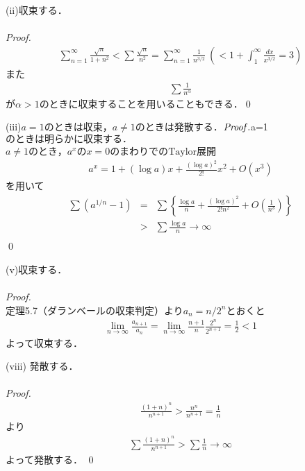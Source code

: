 \documentclass[dvipdfmx,uplatex,11pt]{jsarticle}
\begin{document}
	\begin{screen}
	(ii)収束する．\\
	\dotfill \\
	{\it Proof.}
	\begin{eqnarray*}
	\sum ^{\infty}_{n=1}\frac{\sqrt{n}}{1+n^2}<\sum \frac{\sqrt{n}}{n^2}=\sum^{\infty}_{n=1}\frac{1}{n^{3/2}}~\left(<1+\int^{\infty}_{1}\frac{dx}{x^{3/2}}=3\right)
	\end{eqnarray*}
	また
	\begin{eqnarray*}
	\sum \frac{1}{n^\alpha}
	\end{eqnarray*}
	が$\alpha >1$のときに収束することを用いることもできる．\qed
	\end{screen}
	\begin{screen}
	(iii)$a=1$のときは収束，$a \neq 1$のときは発散する．$\\
	\dotfill \\
	{\it Proof.}\\
	$a=1$のときは明らかに収束する．$\\
	$a \neq 1$のとき，$a^x$の$x=0$のまわりでの$\mathrm{Taylor}$展開
	\begin{eqnarray*}
	a^x=1+(\log a)x+\frac{(\log a)^2}{2!}x^2+O(x^3)
	\end{eqnarray*}
	を用いて
	\begin{eqnarray*}
	\sum (a^{1/n}-1)&=&\sum \left\{ \frac{\log a}{n}+\frac{(\log a)^2}{2!n^2}+O\left(\frac{1}{n^3}\right)\right\}\\
	&>&\sum \frac{\log a}{n} \rightarrow \infty\\
	\end{eqnarray*}
	\qed
	\end{screen}
	
	\begin{screen}
	(v)収束する．\\
	\dotfill \\
	{\it Proof.}\\
	定理5.7（ダランベールの収束判定）より$a_n=n/2^n$とおくと
	\begin{eqnarray*}
	\lim_{n \to \infty}\frac{a_{n+1}}{a_n}=\lim_{n \to \infty}\frac{n+1}{n}\frac{2^n}{2^{n+1}}=\frac{1}{2}<1
	\end{eqnarray*}
	よって収束する．
	\end{screen}
	
	\begin{screen}
	(viii)
	発散する．\\
	\dotfill \\
	{\it Proof.}
	\begin{eqnarray*}
	\frac{(1+n)^n}{n^{n+1}}>\frac{n^n}{n^{n+1}}=\frac{1}{n}
	\end{eqnarray*}
	より
	\begin{eqnarray*}
	\sum \frac{(1+n)^n}{n^{n+1}}>\sum \frac{1}{n} \rightarrow \infty
	\end{eqnarray*}
	よって発散する． \qed
	\end{screen}
	
\end{document}
